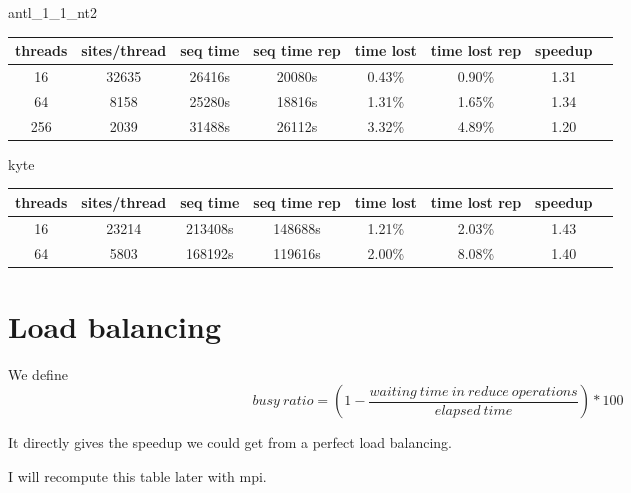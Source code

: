 \documentclass[a4paper]{article}
\begin{document}
antl\_1\_1\_nt2

\begin{tabular}{|c|c|c|c|c|c|c|c|}
\hline threads & sites/thread & seq time & seq time rep & time lost & time lost rep & speedup \\
\hline 16 & 32635 & 26416s & 20080s & 0.43\% & 0.90\% & 1.31 \\
\hline 64 & 8158 & 25280s & 18816s & 1.31\% & 1.65\% & 1.34 \\
\hline 256 & 2039 & 31488s & 26112s & 3.32\% & 4.89\% & 1.20 \\
\hline
\end{tabular} \newline


kyte

\begin{tabular}{|c|c|c|c|c|c|c|c|}
\hline threads & sites/thread & seq time & seq time rep & time lost & time lost rep & speedup \\
\hline 16 & 23214 & 213408s & 148688s & 1.21\% & 2.03\% & 1.43 \\
\hline 64 & 5803 & 168192s & 119616s & 2.00\% & 8.08\% & 1.40 \\
\hline
\end{tabular} \newline



\section{Load balancing}

We define
$$busy\ ratio = (1 - \frac{waiting\ time\ in\ reduce\ operations}{elapsed\ time}) * 100$$

It directly gives the speedup we could get from a perfect load balancing.\newline

I will recompute this table later with mpi.




\end{document}

